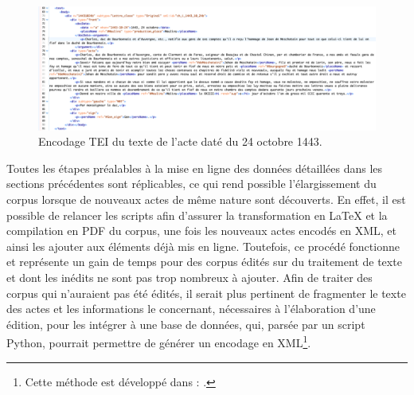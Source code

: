 \begin{figure}[H]
    \centering
    \includegraphics[scale=0.33]{img/encodage_text.png}
    \caption{Encodage TEI du texte de l'acte daté du 24 octobre 1443.}
    \label{fig:encodage_1443}
\end{figure} 

\par Toutes les étapes préalables à la mise en ligne des données détaillées dans les sections précédentes sont réplicables, ce qui rend possible l'élargissement du corpus lorsque de nouveaux actes de même nature sont découverts. En effet, il est possible de relancer les scripts afin d'assurer la transformation en LaTeX et la compilation en PDF du corpus, une fois les nouveaux actes encodés en XML, et ainsi les ajouter aux éléments déjà mis en ligne. Toutefois, ce procédé fonctionne et représente un gain de temps pour des corpus édités sur du traitement de texte et dont les inédits ne sont pas trop nombreux à ajouter. Afin de traiter des corpus qui n'auraient pas été édités, il serait plus pertinent de fragmenter le texte des actes et les informations le concernant, nécessaires à l'élaboration d'une édition, pour les intégrer à une base de données, qui, parsée par un script Python, pourrait permettre de générer un encodage en XML\footnote{Cette méthode est développé dans : \cite{devaleriolaOrdinateurAuService2020}.}. 

\newpage
\thispagestyle{empty}
\mbox{}
\newpage